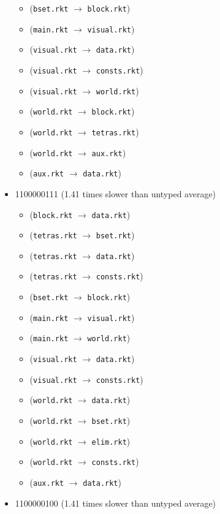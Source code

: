 \documentclass{article}
\newcommand{\mono}[1]{\texttt{#1}}
\begin{document}
\begin{itemize}
\begin{itemize}
  \item (\mono{bset.rkt} $\rightarrow$ \mono{block.rkt})
  \item (\mono{main.rkt} $\rightarrow$ \mono{visual.rkt})
  \item (\mono{visual.rkt} $\rightarrow$ \mono{data.rkt})
  \item (\mono{visual.rkt} $\rightarrow$ \mono{consts.rkt})
  \item (\mono{visual.rkt} $\rightarrow$ \mono{world.rkt})
  \item (\mono{world.rkt} $\rightarrow$ \mono{block.rkt})
  \item (\mono{world.rkt} $\rightarrow$ \mono{tetras.rkt})
  \item (\mono{world.rkt} $\rightarrow$ \mono{aux.rkt})
  \item (\mono{aux.rkt} $\rightarrow$ \mono{data.rkt})
  \end{itemize}
\item 1100000111 (1.41 times slower than untyped average)
  \begin{itemize}
  \item (\mono{block.rkt} $\rightarrow$ \mono{data.rkt})
  \item (\mono{tetras.rkt} $\rightarrow$ \mono{bset.rkt})
  \item (\mono{tetras.rkt} $\rightarrow$ \mono{data.rkt})
  \item (\mono{tetras.rkt} $\rightarrow$ \mono{consts.rkt})
  \item (\mono{bset.rkt} $\rightarrow$ \mono{block.rkt})
  \item (\mono{main.rkt} $\rightarrow$ \mono{visual.rkt})
  \item (\mono{main.rkt} $\rightarrow$ \mono{world.rkt})
  \item (\mono{visual.rkt} $\rightarrow$ \mono{data.rkt})
  \item (\mono{visual.rkt} $\rightarrow$ \mono{consts.rkt})
  \item (\mono{world.rkt} $\rightarrow$ \mono{data.rkt})
  \item (\mono{world.rkt} $\rightarrow$ \mono{bset.rkt})
  \item (\mono{world.rkt} $\rightarrow$ \mono{elim.rkt})
  \item (\mono{world.rkt} $\rightarrow$ \mono{consts.rkt})
  \item (\mono{aux.rkt} $\rightarrow$ \mono{data.rkt})
  \end{itemize}
\item 1100000100 (1.41 times slower than untyped average)

\end{itemize}
\end{document}
